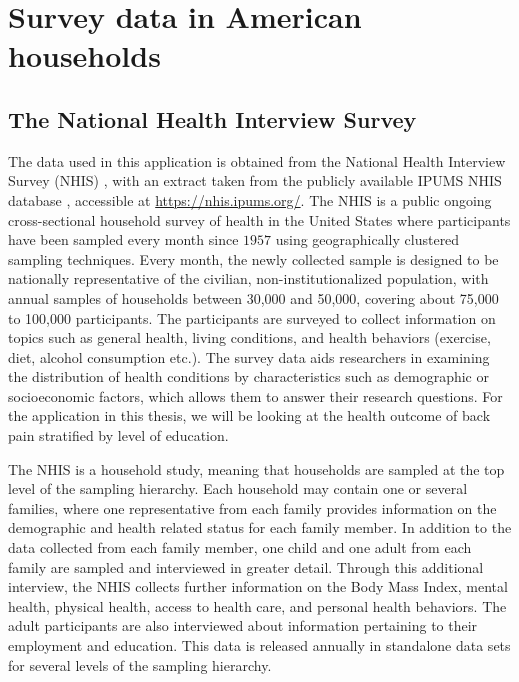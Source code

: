\section{Survey data in American households}\label{section:surveyData}
\subsection{The National Health Interview Survey}
The data used in this application is obtained from the National Health Interview Survey (NHIS) \citep{NHIS-original}, with an extract taken from the publicly available IPUMS NHIS database \citep{IPUMS}, accessible at \url{https://nhis.ipums.org/}. The NHIS is a public ongoing cross-sectional household survey of health in the United States where participants have been sampled every month since $1957$ using geographically clustered sampling techniques. Every month, the newly collected sample is designed to be nationally representative of the civilian, non-institutionalized population, with annual samples of households between 30,000 and 50,000, covering about 75,000 to 100,000 participants. The participants are surveyed to collect information on topics such as general health, living conditions, and health behaviors (exercise, diet, alcohol consumption etc.). The survey data aids researchers in examining the distribution of health conditions by characteristics such as demographic or socioeconomic factors, which allows them to answer their research questions. For the application in this thesis, we will be looking at the health outcome of back pain stratified by level of education.

The NHIS is a household study, meaning that households are sampled at the top level of the sampling hierarchy. Each household may contain one or several families, where one representative from each family provides information on the demographic and health related status for each family member. In addition to the data collected from each family member, one child and one adult from each family are sampled and interviewed in greater detail. Through this additional interview, the NHIS collects further information on the Body Mass Index, mental health, physical health, access to health care, and personal health behaviors. The adult participants are also interviewed about information pertaining to their employment and education. This data is released annually in standalone data sets for several levels of the sampling hierarchy.

